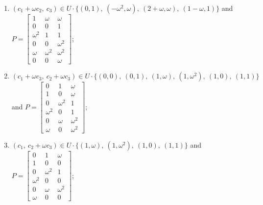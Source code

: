 \begin{enumerate}
\item[(f6)] $(c_1+\omega c_2,\ c_3)\in U\cdot\{(0,1),\allowbreak\ (-\omega^2,\omega),\allowbreak\ (2+\omega,\omega),\allowbreak\ (1-\omega,1)\}$ and $P=\begin{bmatrix}1&\omega&\omega\\0&0&1\\\omega^2&1&1\\0&0&\omega^2\\\omega&\omega^2&\omega^2\\0&0&\omega\end{bmatrix}$;
\item[(f7)] $(c_1+\omega c_3,\ c_2+\omega c_3)\in U\cdot\{(0,0),\allowbreak\ (0,1),\allowbreak\ (1,\omega),\allowbreak\ (1,\omega^2),\allowbreak\ (1,0),\allowbreak\ (1,1)\}$ and $P=\begin{bmatrix}0&1&\omega\\1&0&\omega\\0&\omega^2&1\\\omega^2&0&1\\0&\omega&\omega^2\\\omega&0&\omega^2\end{bmatrix}$;
\item[(f8)] $(c_1,\ c_2+\omega c_3)\in U\cdot\{(1,\omega),\allowbreak\ (1,\omega^2),\allowbreak\ (1,0),\allowbreak\ (1,1)\}$ and $P=\begin{bmatrix}0&1&\omega\\1&0&0\\0&\omega^2&1\\\omega^2&0&0\\0&\omega&\omega^2\\\omega&0&0\end{bmatrix}$;

\end{enumerate}
